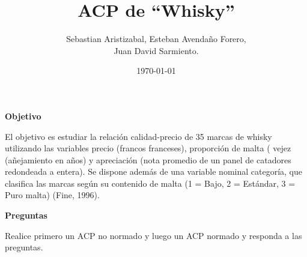 \documentclass[letterpaper, 12pt]{article}
\title{ACP de ``Whisky”}
\author{Sebastian Aristizabal, Esteban Avendaño Forero,\\
Juan David Sarmiento.}
\date{\today}
\begin{document}


\maketitle

\begin{center}
\textbf{Objetivo}
\end{center}

El objetivo es estudiar la relación calidad-precio de 35 marcas de whisky
utilizando las variables precio (francos franceses), proporción de malta (%
vejez (añejamiento en años) y apreciación (nota promedio de un panel de
catadores redondeada a entera). Se dispone además de una variable nominal
categoría, que clasifica las marcas según su contenido de malta (1 = Bajo, 2
= Estándar, 3 = Puro malta) (Fine, 1996).

\newpage
\begin{center}
\textbf{Preguntas}
\end{center}

Realice primero un ACP no normado y luego un ACP normado y responda a las 
preguntas.
\end{document}
